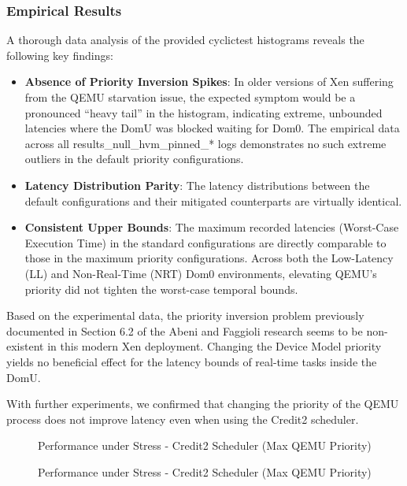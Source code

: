 \subsubsection{Empirical Results}\label{empirical-results}

A thorough data analysis of the provided cyclictest histograms reveals
the following key findings:

\begin{itemize}
\item
  \textbf{Absence of Priority Inversion Spikes}: In older versions of
  Xen suffering from the QEMU starvation issue, the expected symptom
  would be a pronounced ``heavy tail'' in the histogram, indicating
  extreme, unbounded latencies where the DomU was blocked waiting for
  Dom0. The empirical data across all results\_null\_hvm\_pinned\_* logs
  demonstrates no such extreme outliers in the default priority
  configurations.
\item
  \textbf{Latency Distribution Parity}: The latency distributions
  between the default configurations and their mitigated counterparts
  are virtually identical.
\item
  \textbf{Consistent Upper Bounds}: The maximum recorded latencies
  (Worst-Case Execution Time) in the standard configurations are
  directly comparable to those in the maximum priority configurations.
  Across both the Low-Latency (LL) and Non-Real-Time (NRT) Dom0
  environments, elevating QEMU's priority did not tighten the worst-case
  temporal bounds.
\end{itemize}

Based on the experimental data, the priority inversion problem
previously documented in Section 6.2 of the Abeni and Faggioli research
seems to be non-existent in this modern Xen deployment. Changing the
Device Model priority yields no beneficial effect for the latency bounds
of real-time tasks inside the DomU.

With further experiments, we confirmed that changing the priority of the
QEMU process does not improve latency even when using the Credit2
scheduler.

\begin{figure}
\centering

\caption{Performance under Stress - Credit2 Scheduler (Max QEMU
Priority)}
\end{figure}

\begin{figure}
\centering

\caption{Performance under Stress - Credit2 Scheduler (Max QEMU
Priority)}
\end{figure}

